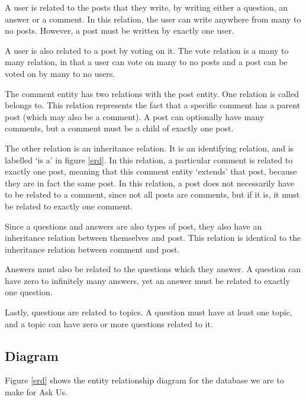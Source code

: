 A user is related to the posts that they write, by writing either a question, an answer or a comment. In this relation, the user can write anywhere from many to no posts. However, a post must be written by exactly one user.

A user is also related to a post by voting on it. The vote relation is a many to many relation, in that a user can vote on many to no posts and a post can be voted on by many to no users.

The comment entity has two relations with the post entity. One relation is called belongs to. This relation represents the fact that a specific comment has a parent post (which may also be a comment). A post can optionally have many comments, but a comment must be a child of exactly one post.

The other relation is an inheritance relation. It is an identifying relation, and is labelled `is a' in figure \ref{erd}. In this relation, a particular comment is related to exactly one post, meaning that this comment entity `extends' that post, because they are in fact the same post. In this relation, a post does not necessarily have to be related to a comment, since not all posts are comments, but if it is, it must be related to exactly one comment.

Since a questions and answers are also types of post, they also have an inheritance relation between themselves and post. This relation is identical to the inheritance relation between comment and post.

Answers must also be related to the questions which they answer. A question can have zero to infinitely many answers, yet an answer must be related to exactly one question.

Lastly, questions are related to topics. A question must have at least one topic, and a topic can have zero or more questions related to it.

\subsection{Diagram}

Figure \ref{erd} shows the entity relationship diagram for the database we are to make for Ask Us.

